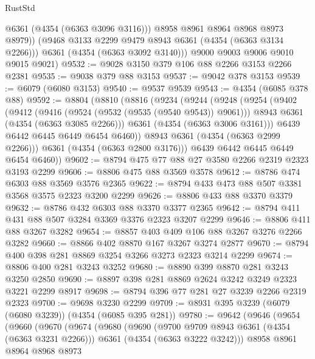 \begin{lexlean}{RustStd}
\begin{coremodule}
              @6361
              (@4354 (@6363 @3096 @3116)))
            @8958
            @8961
            @8964
            @8968
            @8973
            @8979))
        (@9468 @3133 @2299 @9479 @8943 @6361 (@4354 (@6363 @3134 @2266)))
        @6361
        (@4354 (@6363 @3092 @3140)))
      @9000
      @9003
      @9006
      @9010
      @9015
      @9021)
@9532 := @9028 @3150 @379 @106 @88 @2266 @3153 @2266 @2381
@9535 := @9038 @379 @88 @3153
@9537 := @9042 @378 @3153
@9539 := @6079 (@6080 @3153)
@9540 := @9537 @9539
@9543 := @4354 (@6085 @378 @88)
@9592 := @8804
    (@8810
      (@8816
        (@9234
          (@9244
            (@9248
              (@9254
                (@9402
                  (@9412
                    (@9416 (@9524 (@9532 (@9535 (@9540 @9543)) @9061)))
                    @8943
                    @6361
                    (@4354 (@6363 @3085 @2266)))
                  @6361
                  (@4354 (@6363 @3006 @3161)))
                @6439
                @6442
                @6445
                @6449
                @6454
                @6460))
            @8943
            @6361
            (@4354 (@6363 @2999 @2266)))
          @6361
          (@4354 (@6363 @2800 @3176)))
        @6439
        @6442
        @6445
        @6449
        @6454
        @6460))
@9602 := @8794 @475 @77 @88 @27 @3580 @2266 @2319 @2323 @3193 @2299
@9606 := @8806 @475 @88 @3569 @3578
@9612 := @8786 @474 @6303 @88 @3569 @3576 @2365
@9622 := @8794 @433 @473 @88 @507 @3381 @3568 @3575 @2323 @3200 @2299
@9626 := @8806 @433 @88 @3370 @3379
@9632 := @8786 @432 @6303 @88 @3370 @3377 @2365
@9642 := @8794 @411 @431 @88 @507 @3284 @3369 @3376 @2323 @3207 @2299
@9646 := @8806 @411 @88 @3267 @3282
@9654 := @8857 @403 @409 @106 @88 @3267 @3276 @2266 @3282
@9660 := @8866 @402 @8870 @167 @3267 @3274 @2877
@9670 := @8794 @400 @398 @281 @8869 @3254 @3266 @3273 @2323 @3214 @2299
@9674 := @8806 @400 @281 @3243 @3252
@9680 := @8890 @399 @8870 @281 @3243 @3250 @2850
@9690 := @8897 @398 @281 @8869 @2624 @3242 @3249 @2323 @3221 @2299 @8917
@9698 := @8794 @396 @77 @281 @27 @3239 @2266 @2319 @2323
@9700 := @9698 @3230 @2299
@9709 := @8931 @395 @3239 (@6079 (@6080 @3239)) (@4354 (@6085 @395 @281))
@9780 := @9642
    (@9646
      (@9654
        (@9660
          (@9670
            (@9674
              (@9680
                (@9690
                  (@9700 @9709 @8943 @6361 (@4354 (@6363 @3231 @2266)))
                  @6361
                  (@4354 (@6363 @3222 @3242)))
                @8958
                @8961
                @8964
                @8968
                @8973

\end{coremodule}
\end{lexlean}
